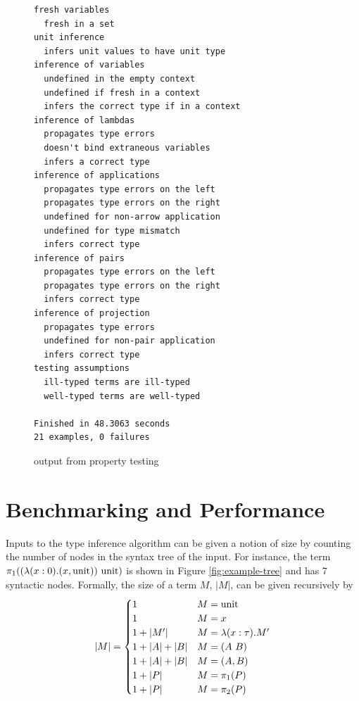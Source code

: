 \begin{figure}
\centering
\begin{verbatim}
fresh variables
  fresh in a set
unit inference
  infers unit values to have unit type
inference of variables
  undefined in the empty context
  undefined if fresh in a context
  infers the correct type if in a context
inference of lambdas
  propagates type errors
  doesn't bind extraneous variables
  infers a correct type
inference of applications
  propagates type errors on the left
  propagates type errors on the right
  undefined for non-arrow application
  undefined for type mismatch
  infers correct type
inference of pairs
  propagates type errors on the left
  propagates type errors on the right
  infers correct type
inference of projection
  propagates type errors
  undefined for non-pair application
  infers correct type
testing assumptions
  ill-typed terms are ill-typed
  well-typed terms are well-typed

Finished in 48.3063 seconds
21 examples, 0 failures
\end{verbatim}
\caption{output from property testing}
\label{fig:tests-output}
\end{figure}

\section{Benchmarking and Performance}
Inputs to the type inference algorithm can be given a notion of size by counting the number of nodes in the syntax tree of the input.
For instance, the term \(\pi_1((\lambda (x : 0). (x, \mathrm{unit}))\ \mathrm{unit})\) is shown in Figure \ref{fig:example-tree} and has 7 syntactic nodes.
Formally, the size of a term \(M\), \(|M|\), can be given recursively by
\[
|M| =
\begin{cases}
1 & M = \mathrm{unit}\\
1 & M = x\\
1 + |M'| & M = \lambda (x : \tau). M'\\
1 + |A| + |B| & M = (A\ B)\\
1 + |A| + |B| & M = (A, B)\\
1 + |P| & M = \pi_1(P)\\
1 + |P| & M = \pi_2(P)\\
\end{cases}
\]

